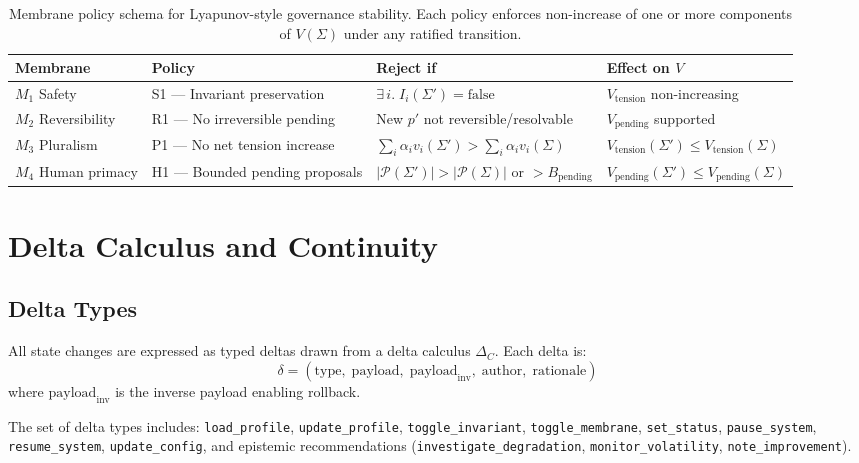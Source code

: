 \documentclass[11pt]{article}
\begin{document}
\begin{table}[h]
\centering
\renewcommand{\arraystretch}{1.4}
\small
\begin{tabular}{p{2.5cm}p{3cm}p{4cm}p{4cm}}
\toprule
\textbf{Membrane} & \textbf{Policy} & \textbf{Reject if} & \textbf{Effect on $V$} \\
\midrule
$M_1$ Safety
  & S1 — Invariant preservation
  & $\exists\,i.\; I_i(\Sigma') = \mathrm{false}$
  & $V_{\mathrm{tension}}$ non-increasing \\[3pt]
$M_2$ Reversibility
  & R1 — No irreversible pending
  & New $p'$ not reversible/resolvable
  & $V_{\mathrm{pending}}$ supported \\[3pt]
$M_3$ Pluralism
  & P1 — No net tension increase
  & $\sum_i \alpha_i v_i(\Sigma') > \sum_i \alpha_i v_i(\Sigma)$
  & $V_{\mathrm{tension}}(\Sigma') \le V_{\mathrm{tension}}(\Sigma)$ \\[3pt]
$M_4$ Human primacy
  & H1 — Bounded pending proposals
  & $|\mathcal{P}(\Sigma')| > |\mathcal{P}(\Sigma)|$ or $> B_{\mathrm{pending}}$
  & $V_{\mathrm{pending}}(\Sigma') \le V_{\mathrm{pending}}(\Sigma)$ \\
\bottomrule
\end{tabular}
\caption{Membrane policy schema for Lyapunov-style governance stability.
  Each policy enforces non-increase of one or more components of $V(\Sigma)$
  under any ratified transition.}
\label{tab:membranes}
\end{table}

\section{Delta Calculus and Continuity}
\label{sec:delta}

\subsection{Delta Types}

All state changes are expressed as typed deltas drawn from
a delta calculus $\Delta_C$. Each delta is:
\[
  \delta = (\mathrm{type},\; \mathrm{payload},\;
            \mathrm{payload}_{\mathrm{inv}},\;
            \mathrm{author},\; \mathrm{rationale})
\]
where $\mathrm{payload}_{\mathrm{inv}}$ is the inverse payload
enabling rollback.

The set of delta types includes: \texttt{load\_profile},
\texttt{update\_profile}, \texttt{toggle\_invariant},
\texttt{toggle\_membrane}, \texttt{set\_status},
\texttt{pause\_system}, \texttt{resume\_system},
\texttt{update\_config}, and epistemic recommendations
(\texttt{investigate\_degradation}, \texttt{monitor\_volatility},
\texttt{note\_improvement}).
\end{document}
